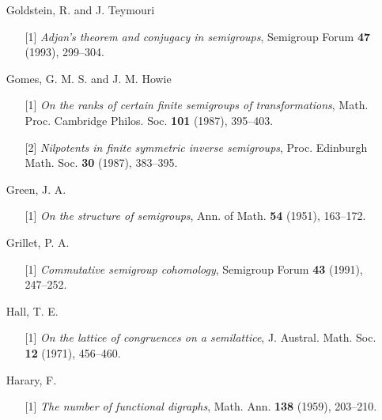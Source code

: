 \documentclass{surv-l}
\numberwithin{equation}{section}
\numberwithin{table}{section}
\numberwithin{figure}{section}
\theoremstyle{definition}
\begin{document}
\begin{enumerate}
\item[] Goldstein, R. and J. Teymouri
\begin{enumerate}
\item[\hypertarget{bib21}{[1]}] \emph{Adjan's theorem and conjugacy in
semigroups}, Semigroup Forum \textbf{47} (1993), 299--304.
\end{enumerate}

\item[] Gomes, G. M. S. and J. M. Howie
\begin{enumerate}
\item[\hypertarget{bib22}{[1]}] \emph{On the ranks of certain finite semigroups of
transformations}, Math. Proc. Cambridge Philos. Soc.
\textbf{101} (1987), 395--403.

\item[\hypertarget{bib22a}{[2]}] \emph{Nilpotents in finite symmetric inverse
semigroups}, Proc. Edinburgh Math. Soc. \textbf{30}
(1987), 383--395.
\end{enumerate}

\item[] Green, J. A.
\begin{enumerate}
\item[\hypertarget{bib24}{[1]}] \emph{On the structure of semigroups}, Ann. of Math.
\textbf{54} (1951), 163--172.
\end{enumerate}

\item[] Grillet, P. A.
\begin{enumerate}
\item[\hypertarget{bib25}{[1]}] \emph{Commutative semigroup cohomology}, Semigroup
Forum \textbf{43} (1991), 247--252.
\end{enumerate}

\item[] Hall, T. E.
\begin{enumerate}
\item[\hypertarget{bib26}{[1]}] \emph{On the lattice of congruences on a semilattice}, J. Austral. Math. Soc. \textbf{12} (1971), 456--460.
\end{enumerate}

\item[] Harary, F.
\begin{enumerate}
\item[\hypertarget{bib27}{[1]}] \emph{The number of functional digraphs}, Math. Ann.
\textbf{138} (1959), 203--210.


\end{enumerate}
\end{enumerate}
\end{document}
